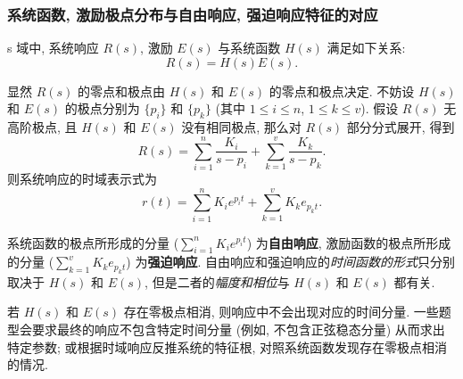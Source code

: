 \subsubsection{系统函数, 激励极点分布与自由响应, 强迫响应特征的对应}
s 域中, 系统响应 $R(s)$, 激励 $E(s)$ 与系统函数 $H(s)$ 满足如下关系:
\begin{equation*}
    R(s)=H(s)E(s).
\end{equation*}

显然 $R(s)$ 的零点和极点由 $H(s)$ 和 $E(s)$ 的零点和极点决定. 不妨设 $H(s)$ 和 $E(s)$ 的极点分别为 $\{p_i\}$ 和 $\{p_k\}$ (其中 $1\leq i\leq n$, $1\leq k\leq v$). 假设 $R(s)$ 无高阶极点, 且 $H(s)$ 和 $E(s)$ 没有相同极点, 那么对 $R(s)$ 部分分式展开, 得到
\begin{equation*}
    R(s)=\sum_{i=1}^{n}\frac{K_i}{s-p_i}+\sum_{k=1}^{v}\frac{K_k}{s-p_k}.
\end{equation*}
则系统响应的时域表示式为
\begin{equation*}
    r(t)=\sum_{i=1}^{n}K_ie^{p_it}+\sum_{k=1}^{v}K_ke_{p_kt}.
\end{equation*}

系统函数的极点所形成的分量 ($\displaystyle\sum_{i=1}^{n}K_ie^{p_it}$) 为\textbf{自由响应}, 激励函数的极点所形成的分量 ($\displaystyle\sum_{k=1}^{v}K_ke_{p_kt}$) 为\textbf{强迫响应}. 自由响应和强迫响应的\textit{时间函数的形式}只分别取决于 $H(s)$ 和 $E(s)$, 但是二者的\textit{幅度和相位}与 $H(s)$ 和 $E(s)$ 都有关.

若 $H(s)$ 和 $E(s)$ 存在零极点相消, 则响应中不会出现对应的时间分量. 一些题型会要求最终的响应不包含特定时间分量 (例如, 不包含正弦稳态分量) 从而求出特定参数; 或根据时域响应反推系统的特征根, 对照系统函数发现存在零极点相消的情况.


